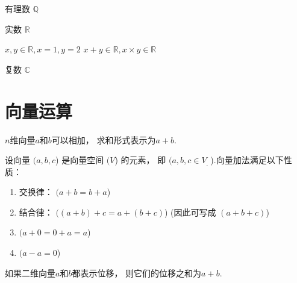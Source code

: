 \begin{example}
    有理数 $ \mathbb{Q} $
\end{example}

\begin{example}
    实数 $ \mathbb{R} $

    $ x, y \in \mathbb{R}, x=1, y=2 $
    $ x+y \in \mathbb{R}  ,x \times y \in \mathbb{R} $
\end{example}

\begin{example}
    复数 $ \mathbb{C} $
\end{example}

\section{向量运算}

\begin{definition}[向量加法]
    $n$维向量$a$和$b$可以相加， 求和形式表示为$a + b$.
\end{definition}

\begin{theorem}
    设向量 $( a, {b}, {c} $) 是向量空间 $( V $) 的元素， 即 $( a, {b}, {c} \in V_{\text {.  }} $).向量加法满足以下性质：

    \begin{enumerate}
        \item 交换律： $( a+b=b+a $)
        \item 结合律： $( (a+b)+c=a+(b+c) $) (因此可写成 $( a+{b}+{c}) $)
        \item $( a+0=0+a=a $)
        \item $( a-a=0 $)
    \end{enumerate}
\end{theorem}

\begin{corollary}[向量位移相加]
    如果二维向量$a$和$b$都表示位移， 则它们的位移之和为$a + b$.
\end{corollary}

